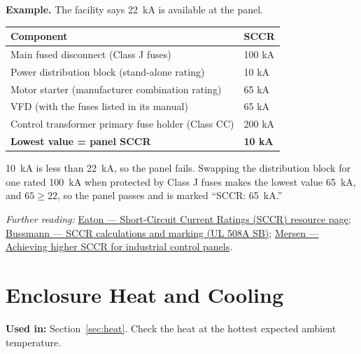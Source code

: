 \textbf{Example.} The facility says 22~kA is available at the panel.
\begin{center}
\small
\begin{tabular}{@{}P{12.52cm}R{4.80cm}@{}}
\toprule
Component & SCCR \\ \midrule
Main fused disconnect (Class J fuses) & 100 kA \\
Power distribution block (stand-alone rating) & 10 kA \\
Motor starter (manufacturer combination rating) & 65 kA \\
VFD (with the fuses listed in its manual) & 65 kA \\
Control transformer primary fuse holder (Class CC) & 200 kA \\ \midrule
\textbf{Lowest value = panel SCCR} & \textbf{10 kA} \\
\bottomrule
\end{tabular}
\end{center}
10~kA is less than 22~kA, so the panel fails. Swapping the distribution block for one rated 100~kA when protected by Class J fuses makes the lowest value 65~kA, and $65 \geq 22$, so the panel passes and is marked ``SCCR: 65~kA.''

\textit{Further reading:} \href{https://www.eaton.com/us/en-us/products/electrical-circuit-protection/short-circuit-current-ratings.html}{Eaton --- Short-Circuit Current Ratings (SCCR) resource page}; \href{https://www.eaton.com/content/dam/eaton/products/electrical-circuit-protection/fuses/solution-center/bus-ele-tech-lib-short-circuit-current-rating-calculations-and-marking-2008-spd.pdf}{Bussmann --- SCCR calculations and marking (UL 508A SB)}; \href{https://www.mersen.com/sites/default/files/files_imported_ep/TT-SCN1-Achieving-Higher-Short-Circuit-Current-Ratings-for-Industrial-Control-Panels-Tech-Topic.pdf}{Mersen --- Achieving higher SCCR for industrial control panels}.

\section{Enclosure Heat and Cooling}
\label{app:eq-heat}
\textbf{Used in:} Section~\ref{sec:heat}. Check the heat at the hottest expected ambient temperature.

